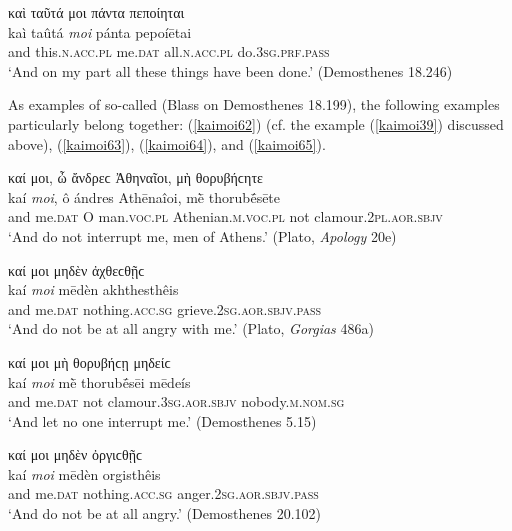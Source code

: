 \begin{exe}
\ex καὶ ταῦτά μοι πάντα πεποίηται\\
\gll kaì taûtá \emph{moi} pánta pepoíētai\\
and this.\textsc{n.acc.pl} me\textsc{.dat} all.\textsc{n.acc.pl}
do.\textsc{3sg.prf.pass}\\
\trans `And on my part all these things have been done.' (Demosthenes 18.246)
\label{kaimoi61}
\end{exe}

As examples of so-called  (Blass on Demosthenes 18.199), the following examples particularly belong together: (\ref{kaimoi62}) (cf. the example (\ref{kaimoi39}) discussed above), (\ref{kaimoi63}), (\ref{kaimoi64}), and (\ref{kaimoi65}).

\begin{exe}
\ex καί μοι, ὦ ἄνδρεϲ Ἀθηναῖοι, μὴ θορυβήϲητε\\
\gll kaí \emph{moi}, ô ándres Athēnaîoi, mḕ thorubḗsēte\\
and me.\textsc{dat} O man.\textsc{voc.pl} Athenian.\textsc{m.voc.pl}
not clamour.\textsc{2pl.aor.sbjv}\\
\trans `And do not interrupt me, men of Athens.' (Plato, \textit{Apology} 20e)
\label{kaimoi62}
\end{exe}

\begin{exe}
\ex καί μοι μηδὲν ἀχθεϲθῇϲ\\
\gll kaí \emph{moi} mēdèn akhthesthêis\\
and me.\textsc{dat} nothing.\textsc{acc.sg} grieve.\textsc{2sg.aor.sbjv.pass}\\
\trans `And do not be at all angry with me.' (Plato, \textit{Gorgias} 486a)
\label{kaimoi63}
\end{exe}

\begin{exe}
\ex καί μοι μὴ θορυβήϲῃ μηδείϲ\\
\gll kaí \emph{moi} mḕ thorubḗsēi mēdeís\\
and me.\textsc{dat} not clamour.\textsc{3sg.aor.sbjv} nobody.\textsc{m.nom.sg}\\
\trans `And let no one interrupt me.' (Demosthenes 5.15)
\label{kaimoi64}
\end{exe}

\begin{exe}
\ex καί μοι μηδὲν ὀργιϲθῇϲ\\
\gll kaí \emph{moi} mēdèn orgisthêis\\
and me.\textsc{dat} nothing.\textsc{acc.sg} anger.\textsc{2sg.aor.sbjv.pass}\\
\trans `And do not be at all angry.' (Demosthenes 20.102)
\label{kaimoi65}
\end{exe}

